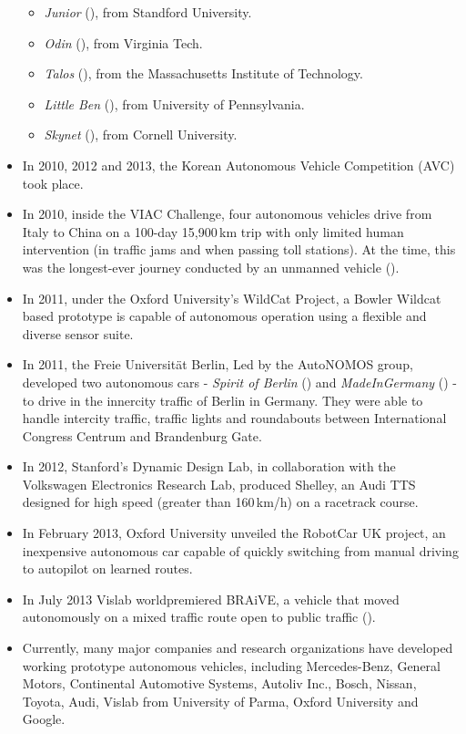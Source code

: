 \begin{itemize}
\begin{itemize}
  \item \emph{Junior} (\cite{Montemerlo2008}), from Standford University.
  \item \emph{Odin} (\cite{Bacha2008}), from Virginia Tech.
  \item \emph{Talos} (\cite{leonard2007team}), from the Massachusetts Institute of Technology.
  \item \emph{Little Ben} (\cite{bohren2008little}), from University of Pennsylvania.
  \item \emph{Skynet} (\cite{miller2008team}), from Cornell University.
 \end{itemize}
 \item In 2010, 2012 and 2013, the Korean Autonomous Vehicle Competition (AVC) took place.
 \item In 2010, inside the VIAC Challenge, four autonomous vehicles drive from Italy to China on a 100-day 15,900\,km trip with only limited human intervention (in traffic jams and when passing toll stations). At the time, this was the longest-ever journey conducted by an unmanned vehicle (\cite{Broggi2010VIAC}).
 \item In 2011, under the Oxford University's WildCat Project, a Bowler Wildcat based prototype is capable of autonomous operation using a flexible and diverse sensor suite.
 \item In 2011, the Freie Universität Berlin, Led by the AutoNOMOS group, developed two autonomous cars - \emph{Spirit of Berlin} (\cite{berlin2007spirit}) and \emph{MadeInGermany} (\cite{gohring2013semi}) - to drive in the innercity traffic of Berlin in Germany. They were able to handle intercity traffic, traffic lights and roundabouts between International Congress Centrum and Brandenburg Gate.
 \item In 2012, Stanford's Dynamic Design Lab, in collaboration with the Volkswagen Electronics Research Lab, produced Shelley, an Audi TTS designed for high speed (greater than 160\,km/h) on a racetrack course.
 \item In February 2013, Oxford University unveiled the RobotCar UK project, an inexpensive autonomous car capable of quickly switching from manual driving to autopilot on learned routes.
 \item In July 2013 Vislab worldpremiered BRAiVE, a vehicle that moved autonomously on a mixed traffic route open to public traffic (\cite{grisleri2010braive}).
 \item Currently, many major companies and research organizations have developed working prototype autonomous vehicles, including Mercedes-Benz, General Motors, Continental Automotive Systems, Autoliv Inc., Bosch, Nissan, Toyota, Audi, Vislab from University of Parma, Oxford University and Google.
\end{itemize}
 
